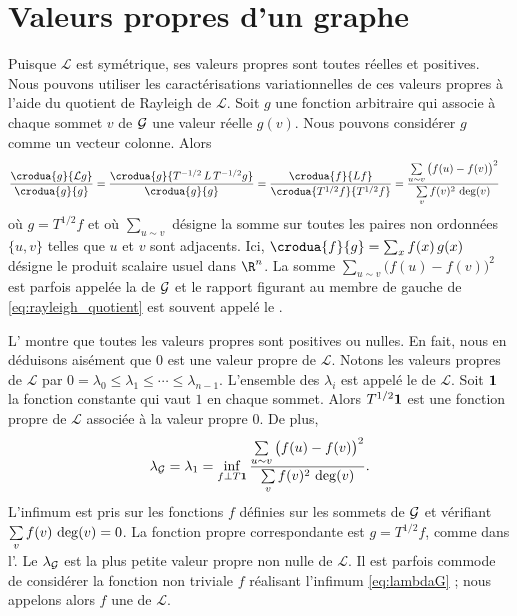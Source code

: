 \section{Valeurs propres d'un graphe} \label{sec:eigenvalues_of_a_graph}

Puisque $\mathcal{L}$ est symétrique, ses valeurs propres sont toutes réelles et positives. Nous pouvons utiliser les caractérisations variationnelles de ces valeurs propres à l'aide du quotient de Rayleigh de $\mathcal{L}$. Soit $g$ une fonction arbitraire qui associe à chaque sommet $v$ de $\mathcal{G}$ une valeur réelle $g(v)$. Nous pouvons considérer $g$ comme un vecteur colonne. Alors
\begin{align}
    \frac{\crodua{g}{\mathcal{L}g}}{\crodua{g}{g}} &= \frac{\crodua{g}{T^{-1/2} \, L \, T^{-1/2} g}}{\crodua{g}{g}}
    = \frac{\crodua{f}{Lf}}{\crodua{T^{1/2} f}{T^{1/2} f}}
    = \frac{\sum\limits_{u \sim v} \big( f(u) - f(v) \big)^2}{\sum\limits_v f(v)^2 \, \degr(v)} \label{eq:rayleigh_quotient}
\end{align}
où $g = T^{1/2} f$ et où $\sum_{u \sim v}$ désigne la somme sur toutes les paires non ordonnées $\{u, v\}$ telles que $u$ et $v$ sont adjacents. Ici, $\crodua{f}{g} = \sum_x f(x) \, g(x)$ désigne le produit scalaire usuel dans $\R^n$. La somme $\sum_{u \sim v} \big( f(u) - f(v) \big)^2$ est parfois appelée la  de $\mathcal{G}$ et le rapport figurant au membre de gauche de \ref{eq:rayleigh_quotient} est souvent appelé le .

L' montre que toutes les valeurs propres sont positives ou nulles. En fait, nous en déduisons aisément que $0$ est une valeur propre de $\mathcal{L}$. Notons les valeurs propres de $\mathcal{L}$ par $0 = \lambda_0 \leqslant \lambda_1 \leqslant \cdots \leqslant \lambda_{n-1}$. L'ensemble des $\lambda_i$ est appelé le  de $\mathcal{L}$. Soit $\mathbf{1}$ la fonction constante qui vaut $1$ en chaque sommet. Alors $T^{1/2} \mathbf{1}$ est une fonction propre de $\mathcal{L}$ associée à la valeur propre $0$. De plus,
\begin{equation} \label{eq:lambdaG}
    \lambda_{\mathcal{G}} = \lambda_1 = \inf_{f \perp T \mathbf{1}} \frac{\sum\limits_{u \sim v} \big( f(u) - f(v) \big)^2}{\sum\limits_v f(v)^2 \, \operatorname{deg}(v)}.
\end{equation}
L'infimum est pris sur les fonctions $f$ définies sur les sommets de $\mathcal{G}$ et vérifiant $\sum\limits_v f(v) \, \operatorname{deg}(v) = 0$. La fonction propre correspondante est $g = T^{1/2} f$, comme dans l'. Le  $\lambda_{\mathcal{G}}$ est la plus petite valeur propre non nulle de $\mathcal{L}$. Il est parfois commode de considérer la fonction non triviale $f$ réalisant l'infimum \ref{eq:lambdaG} ; nous appelons alors $f$ une  de $\mathcal{L}$.

